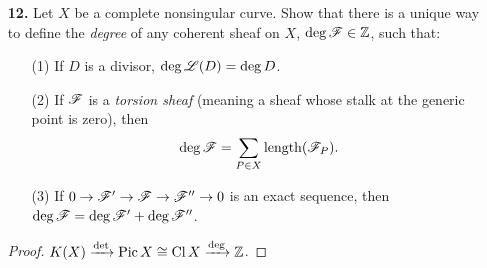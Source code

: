 \documentclass{article}
\begin{document}
\begin{enumerate} [label=\textbf{\arabic*.}, leftmargin=0em]
\begin{proof}
\begin{itemize}
\item[(b)] Let $U_i = \spec{A_i}$ be an open affine cover of $X$ such that $\restr{\fF}{U_i} \cong \widetilde{M}_i$ for some finitely generated $A_i$-module.
Since $X$ is noetherian, a finite number will do, and let $N > 0$ such that the minimal number of generators for $M_i$ is at most $N$ for all $i$.
\end{itemize} 
\end{proof}

\item[\textbf{12.}] Let $X$ be a complete nonsingular curve.
Show that there is a unique way to define the \textit{degree} of any coherent sheaf on $X$, $\deg \mathscr{F} \in \mathbb{Z}$, such that:
\begin{itemize}
    \item[(1)] If $D$ is a divisor, $\deg \mathscr{L}(D) = \deg D$.
    \item[(2)] If $\mathscr{F}$ is a \textit{torsion sheaf} (meaning a sheaf whose stalk at the generic point is zero), then $$\deg \mathscr{F} = \sum_{P \in X} \operatorname{length}(\mathscr{F}_P).$$
    \item[(3)] If $0 \to \mathscr{F}' \to \mathscr{F} \to \mathscr{F}'' \to 0$ is an exact sequence, then $\deg \mathscr{F} = \deg \mathscr{F}' + \deg \mathscr{F}''$.
\end{itemize}

\begin{proof} 
    $K(X) \xrightarrow{\det} \operatorname{Pic} X \cong \operatorname{Cl}{X} \xrightarrow{\deg} \mathbb{Z}$.
\end{proof}

\end{enumerate}
\end{document}
